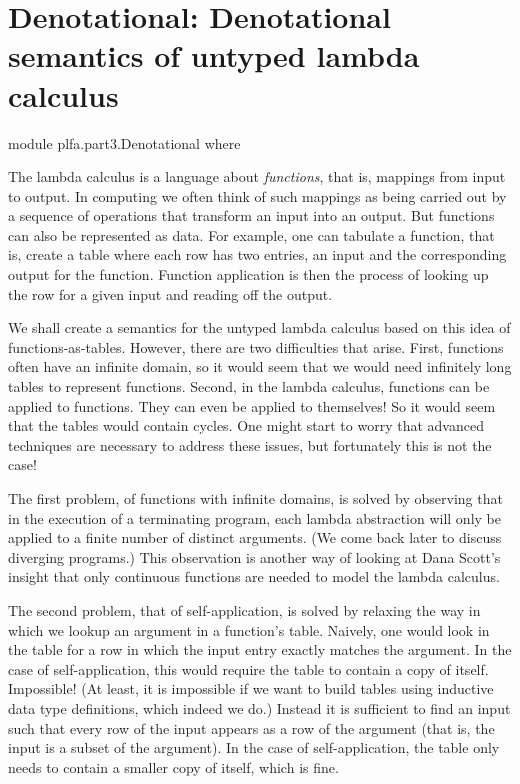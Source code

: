 \hypertarget{Denotational}{%
\chapter{Denotational: Denotational semantics of untyped lambda
calculus}\label{Denotational}}

\begin{fence}
\begin{code}
module plfa.part3.Denotational where
\end{code}
\end{fence}

The lambda calculus is a language about \emph{functions}, that is,
mappings from input to output. In computing we often think of such
mappings as being carried out by a sequence of operations that transform
an input into an output. But functions can also be represented as data.
For example, one can tabulate a function, that is, create a table where
each row has two entries, an input and the corresponding output for the
function. Function application is then the process of looking up the row
for a given input and reading off the output.

We shall create a semantics for the untyped lambda calculus based on
this idea of functions-as-tables. However, there are two difficulties
that arise. First, functions often have an infinite domain, so it would
seem that we would need infinitely long tables to represent functions.
Second, in the lambda calculus, functions can be applied to functions.
They can even be applied to themselves! So it would seem that the tables
would contain cycles. One might start to worry that advanced techniques
are necessary to address these issues, but fortunately this is not the
case!

The first problem, of functions with infinite domains, is solved by
observing that in the execution of a terminating program, each lambda
abstraction will only be applied to a finite number of distinct
arguments. (We come back later to discuss diverging programs.) This
observation is another way of looking at Dana Scott's insight that only
continuous functions are needed to model the lambda calculus.

The second problem, that of self-application, is solved by relaxing the
way in which we lookup an argument in a function's table. Naively, one
would look in the table for a row in which the input entry exactly
matches the argument. In the case of self-application, this would
require the table to contain a copy of itself. Impossible! (At least, it
is impossible if we want to build tables using inductive data type
definitions, which indeed we do.) Instead it is sufficient to find an
input such that every row of the input appears as a row of the argument
(that is, the input is a subset of the argument). In the case of
self-application, the table only needs to contain a smaller copy of
itself, which is fine.

